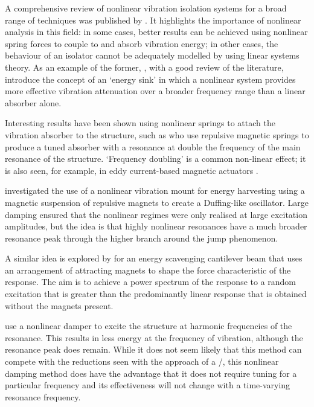 \documentclass[11pt,a4paper]{memoir}
\begin{document}
A comprehensive review of nonlinear vibration isolation systems for a broad range of techniques was published by \textcite{ibrahim2008}.
It highlights the importance of nonlinear analysis in this field: in some cases, better results can be achieved using nonlinear spring forces to couple to and absorb vibration energy; in other cases, the behaviour of an isolator cannot be adequately modelled by using linear systems theory.
As an example of the former, \textcite{starosvetsky2008}, with a good review of the literature, introduce the concept of an `energy sink' in which a nonlinear system provides more effective vibration attenuation over a broader frequency range than a linear absorber alone.

Interesting results have been shown using nonlinear springs to attach the vibration absorber to the structure, such as \textcite{jo2008} who use repulsive magnetic springs to produce a tuned absorber with a resonance at double the frequency of the main resonance of the structure.
`Frequency doubling' is a common non-linear effect; it is also seen, for example, in eddy current-based magnetic actuators \cite{sodano2008-dsmc}.

\textcite{mann2008} investigated the use of a nonlinear vibration mount for energy harvesting using a magnetic suspension of repulsive magnets to create a Duffing-like oscillator.
Large damping ensured that the nonlinear regimes were only realised at large excitation amplitudes, but the idea is that highly nonlinear resonances have a much broader resonance peak through the higher branch around the jump phenomenon.

A similar idea is explored by \textcite{shahruz2008} for an energy scavenging cantilever beam that uses an arrangement of attracting magnets to shape the force characteristic of the response.
The aim is to achieve a power spectrum of the response to a random excitation that is greater than the predominantly linear response that is obtained without the magnets present.

\textcite{zhang2008} use a nonlinear damper to excite the structure at harmonic frequencies of the resonance.
This results in less energy at the frequency of vibration, although the resonance peak does remain.
While it does not seem likely that this method can compete with the reductions seen with the approach of a \vibneut/, this nonlinear damping method does have the advantage that it does not require tuning for a particular frequency and its effectiveness will not change with a time-varying resonance frequency.
\end{document}
